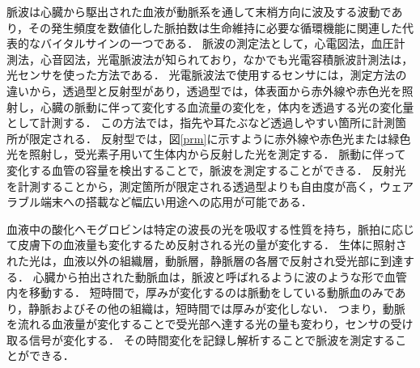 脈波は心臓から駆出された血液が動脈系を通して末梢方向に波及する波動であり\cite{石川太郎1974照明制御システムへの半導体応用, 安藤譲二1990光電式脈波計測の応用}，その発生頻度を数値化した脈拍数は生命維持に必要な循環機能に関連した代表的なバイタルサインの一つである\cite{小林宏光2009脈拍数測定の正確さと測定時間との関係}．
脈波の測定法として，心電図法，血圧計測法，心音図法，光電脈波法が知られており\cite{elgendi2019use}，なかでも光電容積脈波計測法\cite{hertzman1938blood}は，光センサを使った方法である．
光電脈波法で使用するセンサには，測定方法の違いから，透過型と反射型があり，透過型では，体表面から赤外線や赤色光を照射し，心臓の脈動に伴って変化する血流量の変化を，体内を透過する光の変化量として計測する．
この方法では，指先や耳たぶなど透過しやすい箇所に計測箇所が限定される．
反射型では，図\ref{prm}に示すように赤外線や赤色光または緑色光を照射し，受光素子用いて生体内から反射した光を測定する．
脈動に伴って変化する血管の容量を検出することで，脈波を測定することができる．
反射光を計測することから，測定箇所が限定される透過型よりも自由度が高く，ウェアラブル端末への搭載など幅広い用途への応用が可能である．


血液中の酸化ヘモグロビンは特定の波長の光を吸収する性質を持ち，脈拍に応じて皮膚下の血液量も変化するため反射される光の量が変化する．
生体に照射された光は，血液以外の組織層，動脈層，静脈層の各層で反射され受光部に到達する．
心臓から拍出された動脈血は，脈波と呼ばれるように波のような形で血管内を移動する．
短時間で，厚みが変化するのは脈動をしている動脈血のみであり，静脈およびその他の組織は，短時間では厚みが変化しない．
つまり，動脈を流れる血液量が変化することで受光部へ達する光の量も変わり，センサの受け取る信号が変化する．
その時間変化を記録し解析することで脈波を測定することができる．



